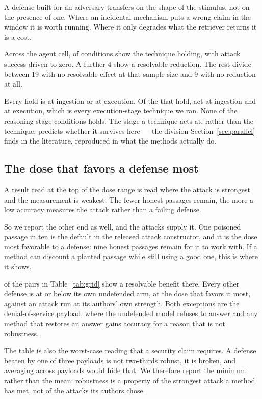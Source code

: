 A defense built for an adversary transfers on the shape of the stimulus, not
on the presence of one. Where an incidental mechanism puts a wrong claim in
the window it is worth running. Where it only degrades what the retriever
returns it is a cost.

Across the agent cell, \NAgentHolds{} of \NAgentConditions{} conditions show
the technique holding, with attack success driven to zero. A further 4 show a
resolvable reduction. The rest divide between 19 with no resolvable effect at
that sample size and 9 with no reduction at all.

Every hold is at ingestion or at execution. Of the
\NAgentHolds{} that hold, \NAgentHoldsIngestion{} act at ingestion and
\NAgentHoldsExecution{} at execution, which is every execution-stage
technique we ran. None of the \NAgentTriedReasoning{}
reasoning-stage conditions holds. The stage a technique acts at, rather than
the technique, predicts whether it survives here --- the division
Section~\ref{sec:parallel} finds in the literature, reproduced in what the
methods actually do.

\subsection{The dose that favors a defense most}
\label{sec:lowdose}

A result read at the top of the dose range is read where the attack is
strongest and the measurement is weakest. The fewer honest passages remain,
the more a low accuracy measures the attack rather than a failing defense.

So we report the other end as well, and the attacks supply it. One poisoned
passage in ten is the default in the released attack constructor, and it is
the dose most favorable to a defense: nine honest passages remain for it to
work with. If a method can discount a planted passage while still using a
good one, this is where it shows.

\NGridLowHelps{} of the \NGridLowPairs{} pairs in Table~\ref{tab:grid} show
a resolvable benefit there. Every other defense is at or below its own
undefended arm, at the dose that favors it most, against an attack run at
its authors' own strength. Both exceptions are the denial-of-service payload,
where the undefended model refuses to answer and any method that restores an
answer gains accuracy for a reason that is not robustness.

The table is also the worst-case reading that a security claim requires. A
defense beaten by one of three payloads is not two-thirds robust, it is broken,
and averaging across payloads would hide that. We therefore report the
minimum rather than the mean: robustness is a property of the strongest
attack a method has met, not of the attacks its authors chose.

